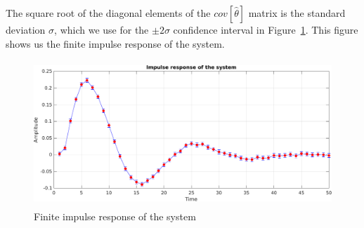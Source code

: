 \documentclass{scrartcl}
\newcommand*{\matlabcode}[3]{\begin{figure}[h!]\end{figure}}
\begin{document}
The square root of the diagonal elements of the $cov[\hat{\theta}]$ matrix is the standard deviation $ \sigma $, which we use for the $ \pm 2 \sigma $ confidence interval in Figure~\ref{fig:fir_response}. This figure shows us the finite impulse response of the system.

\begin{figure}[h]
	\centering
	\includegraphics[height=5.5cm]{figures/fir_response.pdf}
	\caption{Finite impulse response of the system}\label{fig:fir_response}
\end{figure}

\matlabcode{../matlab/ce2/FIR_model_identification.m}{Computing the finite impulse response of the system}{lst:FIR}

\clearpage
\end{document}
